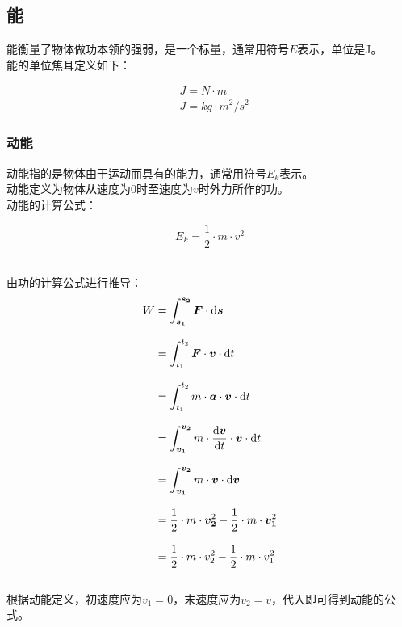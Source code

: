 \documentclass[UTF8]{ctexart}
\newcommand*{\veb}[1]{\vb*{#1}}
\newcommand*{\dif}{\mathop{}\!\mathrm{d}}
\begin{document}
\newpage

\subsection{能}
    能衡量了物体做功本领的强弱，是一个标量，通常用符号$E$表示，单位是\si{J}。\\[3mm]
    能的单位焦耳定义如下：
    \begin{large}
        \begin{align*}
            &\si{J=N\cdot m}\\[3mm]
            &\si{J=kg\cdot m^2/s^2}
        \end{align*}
    \end{large}\vspace{-10pt}

\subsubsection{动能}
    动能指的是物体由于运动而具有的能力，通常用符号$E_k$表示。\\[3mm]
    动能定义为物体从速度为$0$时至速度为$v$时外力所作的功。\\[3mm]
    动能的计算公式：
    \begin{large}
        \begin{equation*}
            E_k=\frac{1}{2}\cdot m\cdot v^2
        \end{equation*}
    \end{large}\\
    由功的计算公式进行推导：
    \setcounter{equation}{0}
    \begin{align}
        W
        &=\int_{\veb{s_1}}^{\veb{s_2}}\veb{F}\cdot\dif\veb{s}\\[3mm]
        &=\int_{t_1}^{t_2}\veb{F}\cdot\veb{v}\cdot\dif t\\[3mm]
        &=\int_{t_1}^{t_2}m\cdot\veb{a}\cdot\veb{v}\cdot\dif t\\[3mm]
        &=\int_{\veb{v_1}}^{\veb{v_2}}m\cdot\frac{\dif\veb{v}}{\dif t}\cdot\veb{v}\cdot\dif t\\[3mm]
        &=\int_{\veb{v_1}}^{\veb{v_2}}m\cdot\veb{v}\cdot\dif\veb{v}\\[3mm]
        &=\frac{1}{2}\cdot m\cdot \veb{v_2}^2-\frac{1}{2}\cdot m\cdot \veb{v_1}^2\\[3mm]
        &=\frac{1}{2}\cdot m\cdot v_2^2-\frac{1}{2}\cdot m\cdot v_1^2
    \end{align}\\
    根据动能定义，初速度应为$v_1=0$，末速度应为$v_2=v$，代入即可得到动能的公式。\\[3mm]
\end{document}
